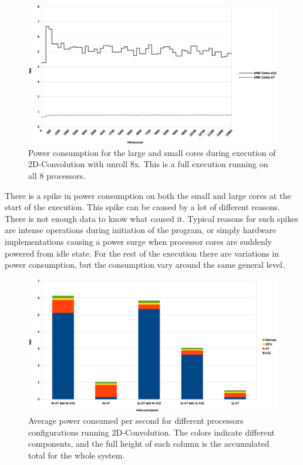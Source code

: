 \begin{figure}[H]
  \centering
  \includegraphics[width=160mm]{fig/power-over-time.eps}
  \caption{Power consumption for the large and small cores during execution of 2D-Convolution with unroll 8x. This is a full execution running on all 8 processors. \label{overflow}}\label{powerovertime}
\end{figure}
There is a spike in power consumption on both the small and large cores at the start of the execution.
This spike can be caused by a lot of different reasons.
There is not enough data to know what caused it.
Typical reasons for such spikes are intense operations during initiation of the program, or simply hardware implementations causing a power surge when processor cores are suddenly powered from idle state.
For the rest of the execution there are variations in power consumption, but the consumption vary around the same general level.

\begin{figure}[H]
  \centering
  \includegraphics[width=160mm]{fig/power-configurations.eps}
  \caption{Average power consumed per second for different processors configurations running 2D-Convolution. The colors indicate different components, and the full height of each column is the accumulated total for the whole system.\label{overflow}} \label{power-configurations}
\end{figure}

